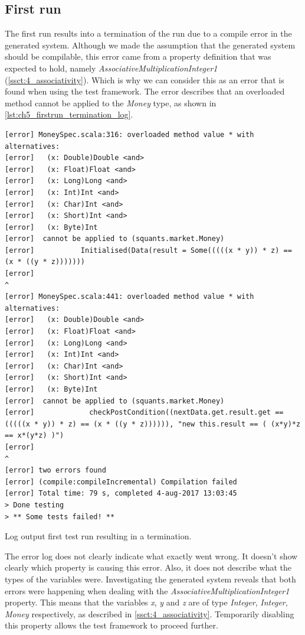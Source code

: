 \subsection{First run}
The first run results into a termination of the run due to a compile error in the generated system. Although we made the assumption that the generated system should be compilable, this error came from a property definition that was expected to hold, namely \textit{AssociativeMultiplicationInteger1} (\autoref{ssct:4_associativity}). Which is why we can consider this as an error that is found when using the test framework. The error describes that an overloaded method cannot be applied to the \textit{Money} type, as shown in \autoref{lst:ch5_firstrun_termination_log}.
\FloatBarrier
\begin{sourcecode}[!ht]
\begin{lstlisting}[language=Log]
[error] MoneySpec.scala:316: overloaded method value * with alternatives:
[error]   (x: Double)Double <and>
[error]   (x: Float)Float <and>
[error]   (x: Long)Long <and>
[error]   (x: Int)Int <and>
[error]   (x: Char)Int <and>
[error]   (x: Short)Int <and>
[error]   (x: Byte)Int
[error]  cannot be applied to (squants.market.Money)
[error]           Initialised(Data(result = Some(((((x * y)) * z) == (x * ((y * z)))))))
[error]                                                                 ^
[error] MoneySpec.scala:441: overloaded method value * with alternatives:
[error]   (x: Double)Double <and>
[error]   (x: Float)Float <and>
[error]   (x: Long)Long <and>
[error]   (x: Int)Int <and>
[error]   (x: Char)Int <and>
[error]   (x: Short)Int <and>
[error]   (x: Byte)Int
[error]  cannot be applied to (squants.market.Money)
[error]             checkPostCondition((nextData.get.result.get == (((((x * y)) * z) == (x * ((y * z)))))), "new this.result == ( (x*y)*z == x*(y*z) )")
[error]                                                                                    ^
[error] two errors found
[error] (compile:compileIncremental) Compilation failed
[error] Total time: 79 s, completed 4-aug-2017 13:03:45
> Done testing
> ** Some tests failed! **
\end{lstlisting}
\caption{Log output first test run resulting in a termination.}
\label{lst:ch5_firstrun_termination_log}
\end{sourcecode}
\FloatBarrier
The error log does not clearly indicate what exactly went wrong. It doesn't
show clearly which property is causing this error. Also, it does not describe
what the types of the variables were. Investigating the generated system reveals
that both errors were happening when dealing with the
\textit{AssociativeMultiplicationInteger1} property. This means that the
variables \textit{x}, \textit{y} and \textit{z} are of type \textit{Integer},
\textit{Integer}, \textit{Money} respectively, as described in
\autoref{ssct:4_associativity}. Temporarily disabling this property allows the
test framework to proceed further.


